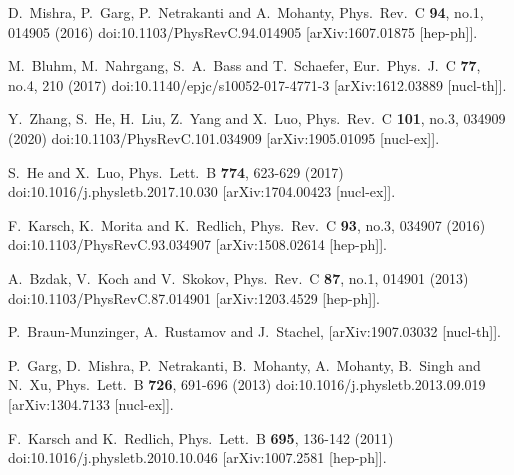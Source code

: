 \begin{thebibliography}{99}
D.~Mishra, P.~Garg, P.~Netrakanti and A.~Mohanty,
Phys.\ Rev.\ C \textbf{94}, no.1, 014905 (2016)
doi:10.1103/PhysRevC.94.014905
[arXiv:1607.01875 [hep-ph]].

M.~Bluhm, M.~Nahrgang, S.~A.~Bass and T.~Schaefer,
Eur.\ Phys.\ J.\ C \textbf{77}, no.4, 210 (2017)
doi:10.1140/epjc/s10052-017-4771-3
[arXiv:1612.03889 [nucl-th]].

Y.~Zhang, S.~He, H.~Liu, Z.~Yang and X.~Luo,
Phys.\ Rev.\ C \textbf{101}, no.3, 034909 (2020)
doi:10.1103/PhysRevC.101.034909
[arXiv:1905.01095 [nucl-ex]].

S.~He and X.~Luo,
Phys.\ Lett.\ B \textbf{774}, 623-629 (2017)
doi:10.1016/j.physletb.2017.10.030
[arXiv:1704.00423 [nucl-ex]].

F.~Karsch, K.~Morita and K.~Redlich,
Phys.\ Rev.\ C \textbf{93}, no.3, 034907 (2016)
doi:10.1103/PhysRevC.93.034907
[arXiv:1508.02614 [hep-ph]].


A.~Bzdak, V.~Koch and V.~Skokov,
Phys.\ Rev.\ C \textbf{87}, no.1, 014901 (2013)
doi:10.1103/PhysRevC.87.014901
[arXiv:1203.4529 [hep-ph]].

P.~Braun-Munzinger, A.~Rustamov and J.~Stachel,
[arXiv:1907.03032 [nucl-th]].

P.~Garg, D.~Mishra, P.~Netrakanti, B.~Mohanty, A.~Mohanty, B.~Singh and N.~Xu,
Phys.\ Lett.\ B \textbf{726}, 691-696 (2013)
doi:10.1016/j.physletb.2013.09.019
[arXiv:1304.7133 [nucl-ex]].

F.~Karsch and K.~Redlich,
Phys.\ Lett.\ B \textbf{695}, 136-142 (2011)
doi:10.1016/j.physletb.2010.10.046
[arXiv:1007.2581 [hep-ph]].


\end{thebibliography}
